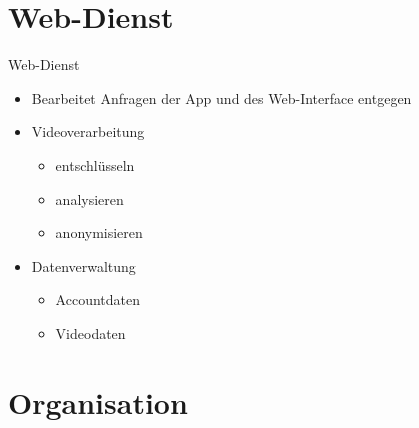 \documentclass[19pt]{beamer}
\begin{document}
\section{Web-Dienst}
\begin{frame}{Web-Dienst}
	\begin{itemize}
		\item Bearbeitet Anfragen der App und des Web-Interface entgegen
		\pause
		\item Videoverarbeitung
			\begin{itemize}
				\item entschl\"usseln
				\item analysieren
				\item anonymisieren
			\end{itemize}
		\pause
		\item Datenverwaltung
			\begin{itemize}
				\item Accountdaten
				\item Videodaten
			\end{itemize}
	\end{itemize}
\end{frame}

\section{Organisation}
\end{document}
